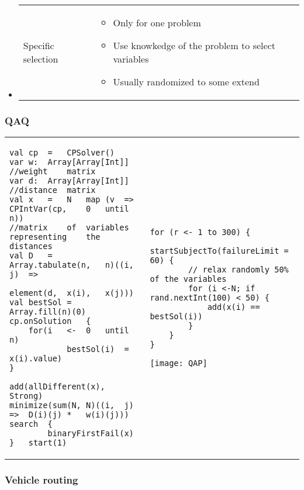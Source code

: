 \begin{itemize}
\begin{itemize}
        \item \begin{tabular}{m{3cm}m{10cm}}
                    Specific selection &
                \begin{itemize}
                    \item Only for one problem
                    \item Use knowkedge of the problem to select variables
                    \item Usually randomized to some extend
                \end{itemize}
            \end{tabular}
        \end{itemize}
\end{itemize}

\subsubsection{QAQ}
\begin{tabular}{m{9cm}m{7cm}}
    \begin{lstlisting}
val	cp	=	CPSolver()	
var	w:	Array[Array[Int]]		//weight	matrix	
var	d:	Array[Array[Int]]		//distance	matrix	
val	x	=	N	map	(v	=>	CPIntVar(cp,	0	until	n))	
//matrix	of	variables			representing	the	distances	
val	D	=	Array.tabulate(n,	n)((i,	j)	=>		
									element(d,	x(i),	x(j)))	
val	bestSol	=	Array.fill(n)(0)	
cp.onSolution	{	
	for(i	<-	0	until	n)		
			bestSol(i)	=	x(i).value)	
}	

add(allDifferent(x),	Strong)
minimize(sum(N,	N)((i,	j)	=>	D(i)(j)	*	w(i)(j)))	
search	{	
		binaryFirstFail(x)	
}	start(1)
\end{lstlisting}
&
\begin{lstlisting}[caption=LNS relax]
for (r <- 1 to 300) {
    startSubjectTo(failureLimit = 60) {
        // relax randomly 50% of the variables
        for (i <-N; if rand.nextInt(100) < 50) {
            add(x(i) == bestSol(i))
        }
    }
}
\end{lstlisting}

\begin{center}
    \texttt{[image: QAP]}
\end{center}
\end{tabular}

\subsubsection{Vehicle routing}

